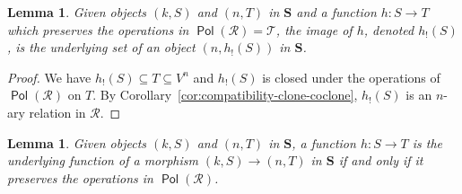 \documentclass[11pt, a4paper, twoside,leqno]{amsart}
\newcommand{\cat}[1]{\mathbf{#1}}
\numberwithin{equation}{section}
\theoremstyle{plain}
\newtheorem{Lemma}[Thm]{Lemma}
\theoremstyle{definition}
\DeclareMathOperator{\Pol}{\mathsf{Pol}}
\begin{document}
\begin{Lemma}
  \label{lem:image-is-rel}
  Given objects \((k,S)\) and \((n,T)\) in \(\cat{S}\) and a function
  \(h \colon S \rightarrow T\) which preserves the operations in \(\Pol(\mathscr{R}
  ) = \mathscr{T}
  \), the image of \(h\), denoted \(h_{!}(S)\),
  is the underlying set of an object \((n,h_{!}(S))\) in \(\cat{S}\). 
\end{Lemma}

\begin{proof}
  We have \(h_{!}(S) \subseteq 
  T\subseteq V^{n}\) and \(h_{!}(S)\) is closed under the operations
  of \(\Pol(\mathscr{R}
  )\) on $T$. By Corollary~\ref{cor:compatibility-clone-coclone}, \(h_{!}(S)\) is an
  \(n\)-ary relation in \(\mathscr{R}\).
\end{proof}


\begin{Lemma}
  \label{lem:mor-iff-preserves-ops}
  Given objects \((k,S)\) and \((n,T)\) in \(\cat{S}\), a function
  \(h \colon S \rightarrow T\) is the underlying function of a
  morphism \((k,S) \rightarrow (n,T)\) in \(\cat{S}\) if and only if
  it preserves the operations in \(\Pol(\mathscr{R}
  )\).
\end{Lemma}
\end{document}
